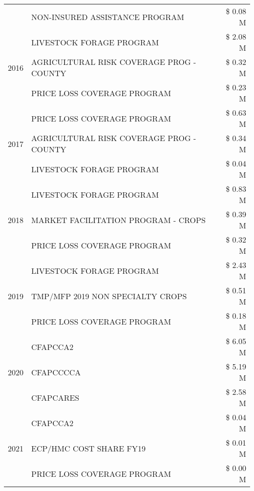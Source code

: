 \begin{tabular}{llr}
 & NON-INSURED ASSISTANCE PROGRAM & \$ 0.08 M \\
\cline{1-3}
\multirow[t]{3}{*}{2016} & LIVESTOCK FORAGE PROGRAM & \$ 2.08 M \\
 & AGRICULTURAL RISK COVERAGE PROG - COUNTY & \$ 0.32 M \\
 & PRICE LOSS COVERAGE PROGRAM & \$ 0.23 M \\
\cline{1-3}
\multirow[t]{3}{*}{2017} & PRICE LOSS COVERAGE PROGRAM & \$ 0.63 M \\
 & AGRICULTURAL RISK COVERAGE PROG - COUNTY & \$ 0.34 M \\
 & LIVESTOCK FORAGE PROGRAM & \$ 0.04 M \\
\cline{1-3}
\multirow[t]{3}{*}{2018} & LIVESTOCK FORAGE PROGRAM & \$ 0.83 M \\
 & MARKET FACILITATION PROGRAM - CROPS & \$ 0.39 M \\
 & PRICE LOSS COVERAGE PROGRAM & \$ 0.32 M \\
\cline{1-3}
\multirow[t]{3}{*}{2019} & LIVESTOCK FORAGE PROGRAM & \$ 2.43 M \\
 & TMP/MFP 2019 NON SPECIALTY CROPS & \$ 0.51 M \\
 & PRICE LOSS COVERAGE PROGRAM & \$ 0.18 M \\
\cline{1-3}
\multirow[t]{3}{*}{2020} & CFAPCCA2 & \$ 6.05 M \\
 & CFAPCCCCA & \$ 5.19 M \\
 & CFAPCARES & \$ 2.58 M \\
\cline{1-3}
\multirow[t]{3}{*}{2021} & CFAPCCA2 & \$ 0.04 M \\
 & ECP/HMC COST SHARE FY19 & \$ 0.01 M \\
 & PRICE LOSS COVERAGE PROGRAM & \$ 0.00 M \\
\cline{1-3}
\bottomrule
\end{tabular}
